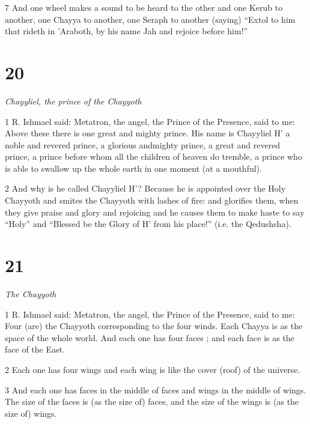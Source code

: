 \par 7 And one wheel makes a sound to be heard to the other and one Kerub to another, one Chayya to another, one Seraph to another (saying) “Extol to him that rideth in 'Araboth, by his name Jah and rejoice before him!” 

\chapter{20}

\par \textit{Chayyliel, the prince of the Chayyoth}

\par 1 R. Ishmael said: Metatron, the angel, the Prince of the Presence, said to me: Above these there is one great and mighty prince. His name is Chayyliel H' a noble and revered prince, a glorious andmighty prince, a great and revered prince, a prince before whom all the children of heaven do tremble, a prince who is able to swallow up the whole earth in one moment (at a mouthful). 

\par 2 And why is he called Chayyliel H'? Because he is appointed over the Holy Chayyoth and smites the Chayyoth with lashes of fire: and glorifies them, when they give praise and glory and rejoicing and he causes them to make haste to say “Holy” and “Blessed be the Glory of H' from his place!” (i.e. the Qedushsha). 

\chapter{21}

\par \textit{The Chayyoth}

\par 1 R. Ishmael said: Metatron, the angel, the Prince of the Presence, said to me: Four (are) the Chayyoth corresponding to the four winds. Each Chayya is as the space of the whole world. And each one has four faces ; and each face is as the face of the East.

\par 2 Each one has four wings and each wing is like the cover (roof) of the universe.

\par 3 And each one has faces in the middle of faces and wings in the middle of wings. The size of the faces is (as the size of) faces, and the size of the wings is (as the size of) wings. 

